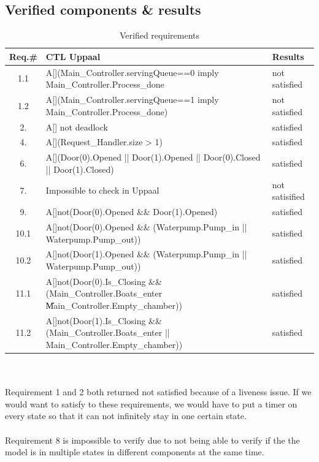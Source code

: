 \documentclass{article}
\begin{document}
    \subsection{Verified components \& results} 
    \begin{table}[h]
            \centering
            \begin{tabular}{|c|p{8cm}|p{2cm}|}
                \hline
              \textbf{Req.\#}  & \textbf{CTL Uppaal} & \textbf{Results}\\
              \hline
              1.1& A[](Main\_Controller.servingQueue==0 imply  Main\_Controller.Process\_done  & not satisfied\\
              \hline
              1.2 & A[](Main\_Controller.servingQueue==1 imply  Main\_Controller.Process\_done) & not satisfied \\
              \hline
              2. & A[] not deadlock & satisfied \\
              \hline
              4. & A[](Request\_Handler.size > 1) & satisfied \\
              \hline
              6. & A[](Door(0).Opened || Door(1).Opened || Door(0).Closed  || Door(1).Closed) & satisfied \\
              \hline
              7. & Impossible to check in Uppaal & not satisified \\
              \hline
              9. & A[]not(Door(0).Opened \&\& Door(1).Opened) & satisfied \\
              \hline
              10.1 & A[]not(Door(0).Opened \&\& (Waterpump.Pump\_in || Waterpump.Pump\_out)) & satisfied \\
              \hline
              10.2 & A[]not(Door(1).Opened \&\& (Waterpump.Pump\_in || Waterpump.Pump\_out)) & satisfied \\
              \hline
              11.1 & A[]not(Door(0).Is\_Closing \&\& (Main\_Controller.Boats\_enter \|\| Main\_Controller.Empty\_chamber)) & satisfied \\
              \hline
              11.2 & A[]not(Door(1).Is\_Closing \&\& (Main\_Controller.Boats\_enter || Main\_Controller.Empty\_chamber)) & satisfied \\ 
              \hline
            \end{tabular}
            \caption{Verified requirements}
            \label{tab:verif}
        \end{table}\\\\
        Requirement 1 and 2 both returned not satisfied because of a liveness issue. If we would want to satisfy to these requirements, we would have to put a timer on every state so that it can not infinitely stay in one certain state. \\\\
        Requirement 8 is impossible to verify due to not being able to verify if the the model is in multiple states in different components at the same time.
        
\end{document}
